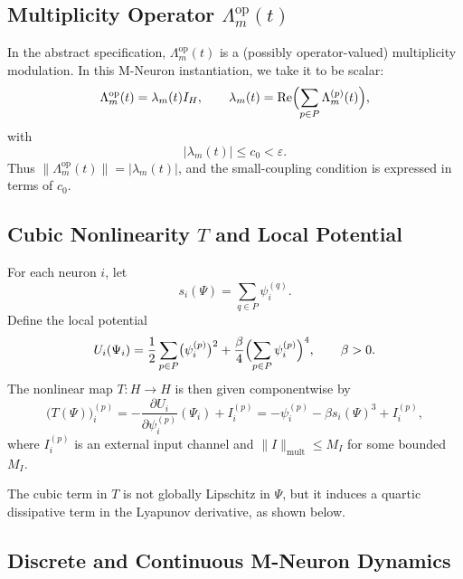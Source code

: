 \documentclass[11pt]{article}
\begin{document}
\subsection{Multiplicity Operator \(\Lambda_m^{\mathrm{op}}(t)\)}

In the abstract specification, \(\Lambda_m^{\mathrm{op}}(t)\) is a (possibly operator-valued) multiplicity modulation.
In this M-Neuron instantiation, we take it to be scalar:
\begin{equation}
\label{eq:Lambda-operator}
\Lambda_m^{\mathrm{op}}(t)
= \lambda_m(t) I_H,
\qquad
\lambda_m(t)
= \operatorname{Re}\Bigl(\sum_{p\in P}\Lambda_m^{(p)}(t)\Bigr),
\end{equation}
with
\begin{equation}
\label{eq:lambda-bound}
|\lambda_m(t)| \le c_0 < \varepsilon.
\end{equation}
Thus \(\|\Lambda_m^{\mathrm{op}}(t)\| = |\lambda_m(t)|\), and the small-coupling condition is expressed in terms of \(c_0\).

\subsection{Cubic Nonlinearity \(T\) and Local Potential}

For each neuron \(i\), let
\[
s_i(\Psi) = \sum_{q\in P} \psi_i^{(q)}.
\]
Define the local potential
\begin{equation}
\label{eq:local-potential}
U_i(\Psi_i)
= \frac12 \sum_{p\in P}\bigl(\psi_i^{(p)}\bigr)^2
+ \frac{\beta}{4}\Bigl(\sum_{p\in P}\psi_i^{(p)}\Bigr)^4,
\qquad \beta > 0.
\end{equation}
The nonlinear map \(T:H\to H\) is then given componentwise by
\begin{equation}
\label{eq:T-definition}
\bigl(T(\Psi)\bigr)_i^{(p)}
= -\frac{\partial U_i}{\partial \psi_i^{(p)}}(\Psi_i)
+ I_i^{(p)}
= -\psi_i^{(p)} - \beta s_i(\Psi)^3 + I_i^{(p)},
\end{equation}
where \(I_i^{(p)}\) is an external input channel and \(\|I\|_{\mathrm{mult}}\le M_I\) for some bounded \(M_I\).

The cubic term in \(T\) is not globally Lipschitz in \(\Psi\), but it induces a quartic dissipative term in the Lyapunov derivative, as shown below.

\subsection{Discrete and Continuous M-Neuron Dynamics}
\end{document}
